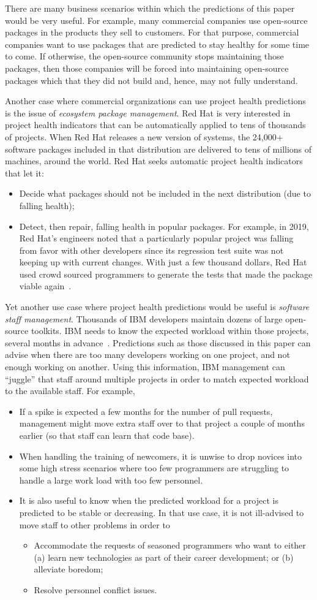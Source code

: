 \documentclass[sigconf,review,anonymous]{acmart}
\newcommand{\bi}{\begin{itemize}}
\newcommand{\ei}{\end{itemize}}
\begin{document}
 
 There are many business scenarios within which the predictions of this paper would be very useful.
For example,
many commercial companies   use open-source packages in the products they sell to customers. For that purpose,
commercial companies want to use packages that are predicted to stay healthy for some time to come. If otherwise, the open-source community stops maintaining those
packages,
then those companies
will be forced into maintaining open-source packages which that they did not build and, hence,   may not fully understand.

Another case where commercial organizations can use project health predictions is the issue
of {\em ecosystem package management}.
Red Hat  is very interested in project health indicators that can be automatically applied to tens of thousands of projects. 
 When Red Hat releases a new version of systems, the  24,000+ software packages included in that distribution are   delivered to tens of millions of machines, around the world.  Red Hat seeks automatic project health indicators that let it:
\bi
\item Decide what packages should not be included in the next distribution (due to falling health);
\item Detect, then repair, falling health in   popular packages.
For example, in 2019, Red Hat's engineers
noted that a particularly popular  project was falling from favor with other developers since its regression test suite was not keeping up with current changes. With just a few thousand dollars, Red Hat used crowd sourced programmers
to generate the tests that made the package viable again~\cite{stewart19}.
\ei
Yet another use case where project health predictions would be useful is {\em software staff management}.
  Thousands of IBM developers maintain dozens of    large open-source toolkits. 
 IBM needs to know the expected workload within those projects, several months in advance~\cite{krishna2018connection}.
 Predictions such as those discussed in this paper can advise when  there are too many developers working on one project, and not enough working on another.
Using this information,
 IBM management  can    ``juggle'' that staff around multiple  projects in order to match   expected workload to the available staff. 
 For example, 
 \bi
 \item
 If a spike is expected a few months for the number of pull
 requests,    management might move extra staff over to that project a couple of months earlier (so that staff can learn that code base). 
 \item When handling  the training of newcomers, it is unwise to drop novices into some high stress scenarios where too few programmers are struggling to handle a large work load with too few personnel.
 \item It is also useful to know when the predicted workload for a project is predicted to be stable or decreasing. In that use case, it is not ill-advised to move staff to other problems in order to 
 \bi
 \item
 Accommodate the requests of seasoned programmers who want to either (a) learn new technologies as part of their career development; or (b)
 alleviate boredom;
 \item Resolve personnel conflict issues.
 \ei
 \ei
\end{document}
